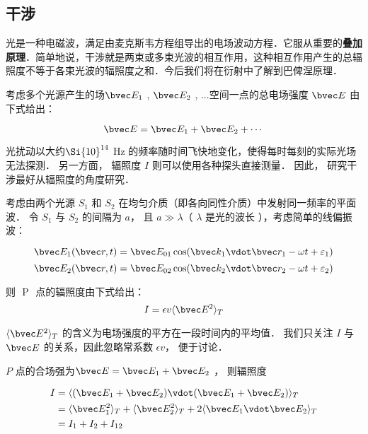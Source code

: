 
\subsection{干涉}

光是一种电磁波，满足由麦克斯韦方程组导出的电场波动方程．它服从重要的\textbf{叠加原理}．简单地说，干涉就是两束或多束光波的相互作用，这种相互作用产生的总辐照度不等于各束光波的辐照度之和．今后我们将在衍射中了解到巴俾涅原理．

考虑多个光源产生的场$\bvec E_1$ , $\bvec E_2$ , ...空间一点的总电场强度 $\bvec E$ 由下式给出：

\begin{equation}
\bvec E = \bvec E_1 + \bvec E_2 + \cdots
\end{equation}

光扰动以大约$\Si{10}^{14}$ Hz 的频率随时间飞快地变化，使得每时每刻的实际光场无法探测． 另一方面， 辐照度 $I$ 则可以使用各种探头直接测量． 因此， 研究干涉最好从辐照度的角度研究．

考虑由两个光源 $S_1$ 和 $S_2$ 在均匀介质（即各向同性介质）中发射同一频率的平面波． 令 $S_1$ 与 $S_2$ 的间隔为 $a$， 且 $ a \gg \lambda $（ $\lambda$ 是光的波长 ），考虑简单的线偏振波：

$$ \bvec E_1 ( \bvec r , t) = \bvec E_{01} \cos (\bvec k_1 \vdot \bvec r_1 - \omega t + \varepsilon_1 )$$
$$ \bvec E_2 ( \bvec r , t) = \bvec E_{02} \cos (\bvec k_2 \vdot \bvec r_2 - \omega t + \varepsilon_2 )$$

则 $ $ P $ $ 点的辐照度由下式给出：
\begin{equation}
 I = \epsilon v \langle \bvec E^2 \rangle _T 
\end{equation}

$\langle \bvec E^2 \rangle _T$ 的含义为电场强度的平方在一段时间内的平均值． 我们只关注 $ I $ 与 $ \bvec E $ 的关系，因此忽略常系数 $ \epsilon v$， 便于讨论． 

 $ P $ 点的合场强为$ \bvec E = \bvec E_1 + \bvec E_2 $ ， 则辐照度

\begin{equation}   
\begin{aligned}
I &= \langle( \bvec E_1 + \bvec E_2)\vdot( \bvec E_1 + \bvec E_2 )\rangle _T \\
&= \langle \bvec E_1^2 \rangle _T + \langle \bvec E_2^2 \rangle _T + 2\langle \bvec E_1 \vdot \bvec E_2 \rangle _T \\
&= I_1 + I_2 + I_{12}
\end{aligned}
\end{equation}


